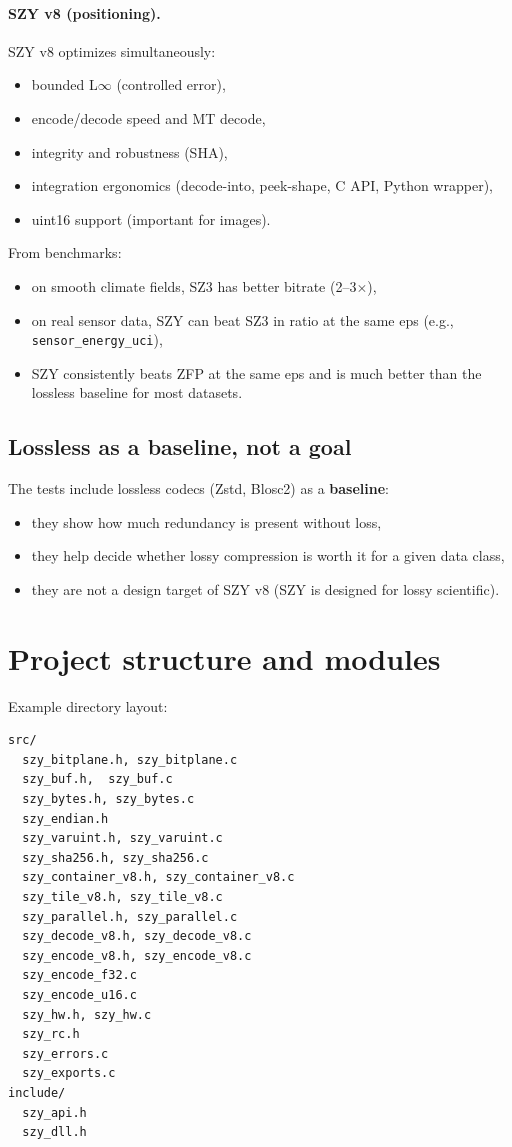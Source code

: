 \documentclass[11pt,a4paper]{article}
\begin{document}
\paragraph{SZY v8 (positioning).}
SZY v8 optimizes simultaneously:
\begin{itemize}
  \item bounded L$\infty$ (controlled error),
  \item encode/decode speed and MT decode,
  \item integrity and robustness (SHA),
  \item integration ergonomics (decode-into, peek-shape, C API, Python wrapper),
  \item uint16 support (important for images).
\end{itemize}
From benchmarks:
\begin{itemize}
  \item on smooth climate fields, SZ3 has better bitrate (2--3$\times$),
  \item on real sensor data, SZY can beat SZ3 in ratio at the same eps (e.g., \texttt{sensor\_energy\_uci}),
  \item SZY consistently beats ZFP at the same eps and is much better than the lossless baseline for most datasets.
\end{itemize}

\subsection{Lossless as a baseline, not a goal}
The tests include lossless codecs (Zstd, Blosc2) as a \textbf{baseline}:
\begin{itemize}
  \item they show how much redundancy is present without loss,
  \item they help decide whether lossy compression is worth it for a given data class,
  \item they are not a design target of SZY v8 (SZY is designed for lossy scientific).
\end{itemize}

\section{Project structure and modules}
Example directory layout:
\begin{verbatim}
src/
  szy_bitplane.h, szy_bitplane.c
  szy_buf.h,  szy_buf.c
  szy_bytes.h, szy_bytes.c
  szy_endian.h
  szy_varuint.h, szy_varuint.c
  szy_sha256.h, szy_sha256.c
  szy_container_v8.h, szy_container_v8.c
  szy_tile_v8.h, szy_tile_v8.c
  szy_parallel.h, szy_parallel.c
  szy_decode_v8.h, szy_decode_v8.c
  szy_encode_v8.h, szy_encode_v8.c
  szy_encode_f32.c
  szy_encode_u16.c
  szy_hw.h, szy_hw.c
  szy_rc.h
  szy_errors.c
  szy_exports.c
include/
  szy_api.h
  szy_dll.h
\end{verbatim}
\end{document}
